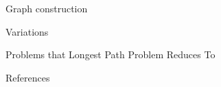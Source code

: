 \documentclass[xcolor=dvipsnames]{beamer}
\begin{document}
\begin{section}{Graph construction }

\begin{section}{Variations}
    
\end{section}
\begin{section}{Problems that Longest Path Problem Reduces To}
    
\end{section}

\end{section}


\begin{frame}[allowframebreaks]{References}
    
    
    
\end{frame}
  
  

   
      
\end{document}
